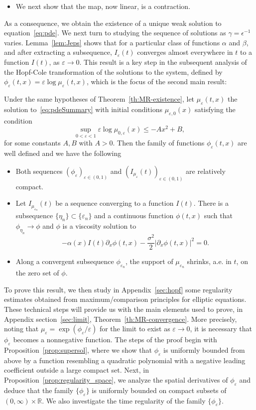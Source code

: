 \documentclass[onefignum,onetabnum]{siamart190516}
\newcommand{\1}{\mathbbm{1}}
\newcommand{\eps}{\varepsilon}
\newcommand{\review}[1]{\textcolor{midblue}{ #1}}
\renewcommand{\review}[1]{{ #1}}
\begin{document}
{{\begin{itemize}
\item We next show that the map, now linear, is a contraction. 
\end{itemize} 
As a consequence, we obtain the existence of a unique weak solution to equation~\eqref{eq:pde}.
We next turn to studying the sequence of solutions as $\gamma=\epsilon^ {-1}$ varies. Lemma~\ref{lem:Jeps} shows that for a particular class of functions $\alpha$ and $\beta$, and after extracting a subsequence, $I_\eps(t)$ converges almost everywhere in $t$ to a function $I(t)$, as $\eps\rightarrow0$. This result is a key step in the subsequent analysis of the Hopf-Cole transformation of the solutions to the system, defined by $\phi_\eps(t,x)=\eps\log \mu_{\eps}(t,x)$,  which is the focus of the second main result:}
\begin{theorem}
\label{th:MR-convergence}
Under the same hypotheses of Theorem~\ref{th:MR-existence}, let $\mu_\eps(t,x)$ the solution to~\eqref{eq:pdeSummary} with initial conditions $\mu_{\eps,0}(x)$ satisfying the condition
$$
\sup_{0<\eps<1}\eps\log\mu_{0,\eps}(x)\leq -Ax^2+B,
$$
for some constants $A,B$ with $A>0$. Then the family of functions $\phi_\eps(t,x)$ are well defined and we have the following
\begin{itemize}
\item Both sequences $(\phi_\eps)_{\eps\in(0,1)}$ and $(I_{\mu_\eps}(t))_{\eps\in(0,1)}$ are relatively compact.
\item Let $I_{\mu_{\eps_n}}(t)$ be a sequence converging to a function $I(t)$. There is a subsequence $\{\eta_n\}\subset\{\eps_n\}$ and a continuous function $\phi(t,x)$ such that $\phi_{\eta_n}\rightarrow\phi$ and $\phi$ is a viscosity solution to 
$$
-\alpha(x)I(t)\partial_x\phi(t,x)-\frac{\sigma^2}{2}|\partial_x\phi(t,x)|^2= 0.
$$
\item Along a convergent subsequence $\phi_{\eps_n}$, the support of $\mu_{\eps_n}$ shrinks, \review{a.e. in $t$,} on the zero set of $\phi$.
\end{itemize}
\end{theorem}
\review{To prove this result, we then study in Appendix~\ref{sec:hopf} some regularity estimates obtained from maximum/comparison principles for elliptic equations. These technical steps will provide us with the main elements used to prove, in Appendix section~\ref{sec:limit}, Theorem~\ref{th:MR-convergence}. More precisely, noting that $\mu_\eps=\exp(\phi_\eps/\eps)$ for the limit to exist as $\eps\rightarrow0$, it is necessary that $\phi_\eps$ becomes a nonnegative function. The steps of the proof begin with Proposition~\ref{prop:supersol}, where we show that $\phi_\varepsilon$ is uniformly bounded from above by a function resembling a quadratic polynomial with a negative leading coefficient outside a large compact set. Next, in Proposition~\ref{prop:regularity_space}, we analyze the spatial derivatives of $\phi_\varepsilon$ and deduce that the family $\{\phi_\varepsilon\}$ is uniformly bounded on compact subsets of $(0, \infty) \times \mathbb{R}$. We also investigate the time regularity of the family $\{\phi_\varepsilon\}$.
}}
\end{document}
